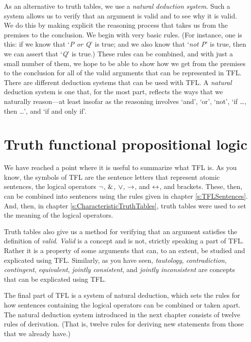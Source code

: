 As an alternative to truth tables, we use a \textit{natural deduction system}. Such a system allows us to verify that an argument is valid and to see why it is valid. We do this by making explicit the reasoning process that takes us from the premises to the conclusion. We begin with very basic rules. (For instance, one is this: if we know that `\textit{P or Q}' is true; and we also know that `\textit{not P}' is true, then we can assert that `\textit{Q}' is true.) These rules can be combined, and with just a small number of them, we hope to be able to show how we get from the premises to the conclusion for all of the valid arguments that can be represented in TFL. There are different deduction systems that can be used with TFL. A \textit{natural} deduction system is one that, for the most part, reflects the ways that we naturally reason---at least insofar as the reasoning involves ‘and’, ‘or’, ‘not’, ‘if \ldots, then \ldots’, and ‘if and only if’. 


\section{Truth functional propositional logic}

We have reached a point where it is useful to summarize what TFL is. As you know, the symbols of TFL are the sentence letters that represent atomic sentences, the logical operators ${\neg}$, $\mathbin{\&}$, $\vee$, $\rightarrow$, and $\leftrightarrow$, and brackets. These, then, can be combined into sentences using the rules given in chapter \ref{s:TFLSentences}. And, then, in chapter \ref{s:CharacteristicTruthTables}, truth tables were used to set the meaning of the logical operators. 

Truth tables also give us a method for verifying that an argument satisfies the definition of \textit{valid}. \textit{Valid} is a concept and is not, strictly speaking a part of TFL. Rather it is a property of some arguments that can, to an extent, be studied and explicated using TFL. Similarly, as you have seen, \textit{tautology}, \textit{contradiction}, \textit{contingent}, \textit{equivalent},  \textit{jointly consistent}, and \textit{jointly inconsistent} are concepts that can be explicated using TFL.

The final part of TFL is a system of natural deduction, which sets the rules for how sentences containing the logical operators can be combined or taken apart. The natural deduction system introduced in the next chapter consists of twelve rules of derivation. (That is, twelve rules for deriving new statements from those that we already have.)

